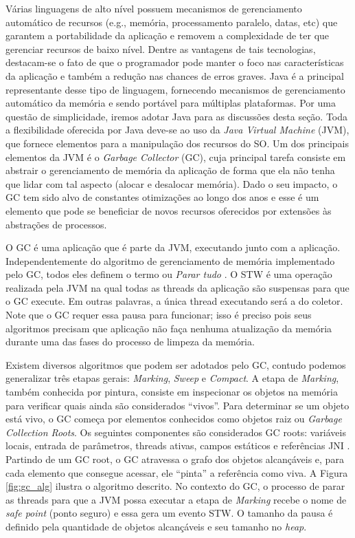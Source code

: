 Várias linguagens de alto nível possuem mecanismos de gerenciamento automático de recursos
(e.g., memória, processamento paralelo, datas, etc) que garantem a portabilidade
da aplicação e removem a complexidade de ter que gerenciar recursos de baixo
nível. Dentre as vantagens de tais tecnologias, destacam-se o fato de que o
programador pode manter o foco nas características da aplicação e também a redução
nas chances de erros graves. Java é a principal representante desse tipo de
linguagem, fornecendo mecanismos de gerenciamento automático da memória e sendo
portável para múltiplas plataformas. Por uma questão de simplicidade, iremos
adotar Java para as discussões desta seção. Toda a flexibilidade
oferecida por Java deve-se ao uso da \emph{Java Virtual Machine} (JVM), que
fornece elementos para a manipulação dos recursos do SO. Um dos principais
elementos da JVM é o \emph{Garbage Collector} (GC), cuja principal tarefa
consiste em abstrair o gerenciamento de memória da aplicação de forma que ela
não tenha que lidar com tal aspecto (alocar e desalocar memória). Dado o seu impacto, o
GC tem sido alvo de constantes otimizações ao longo dos anos e esse é um
elemento que pode se beneficiar de novos recursos oferecidos por extensões às
abstrações de processos.

O GC é uma aplicação que é parte da JVM, executando junto com a aplicação.
Independentemente do algoritmo de gerenciamento de memória implementado pelo
GC, todos eles definem o termo  ou
\emph{Parar tudo} \citep{gc_pauseless}. O STW é uma operação realizada pela
JVM  na qual todas as threads da aplicação são suspensas para que o GC execute.
Em outras palavras, a única thread executando será a do coletor. Note que o GC
requer essa pausa para funcionar; isso é preciso pois seus algoritmos precisam que
aplicação não faça nenhuma atualização da memória durante uma das fases do
processo de limpeza da memória.

Existem diversos algoritmos que podem ser adotados pelo GC, contudo podemos
generalizar três etapas gerais: \emph{Marking}, \emph{Sweep} e
\emph{Compact}. A etapa de \emph{Marking}, também conhecida por pintura,
consiste em inspecionar os objetos na memória para verificar quais ainda são
considerados ``vivos''. Para determinar se um objeto está vivo, o GC começa por
elementos conhecidos como objetos raiz ou \emph{Garbage Collection Roots}. Os
seguintes componentes são considerados GC roots: variáveis locais,
entrada de parâmetros, threads ativas, campos estáticos e referências JNI
\citep{gc_basics}. Partindo de um GC root, o GC atravessa o grafo dos objetos
alcançáveis e, para cada elemento que consegue acessar, ele ``pinta'' a referência
como viva. A Figura \ref{fig:gc_alg} ilustra o algoritmo descrito. No contexto
do GC, o processo de parar as threads para que a JVM possa executar a etapa de
\emph{Marking} recebe o nome de \emph{safe point} (ponto seguro) e essa
gera um evento STW. O tamanho da pausa é definido pela quantidade de objetos
alcançáveis e seu tamanho no \emph{heap}.

